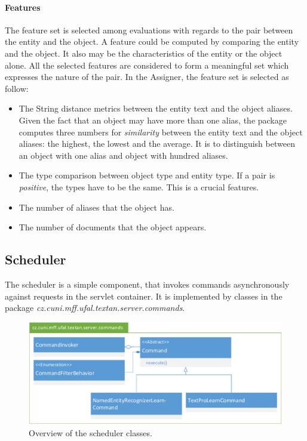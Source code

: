 
\paragraph{Features}

The feature set is selected among evaluations with regards to the pair between
the entity and the object. A feature could be computed by comparing the entity 
and the object. It also may be the characteristics of the entity or the object 
alone. All the selected features are considered to form a meaningful set which
expresses the nature of the pair. In the Assigner, the feature set is selected 
as follow:

\begin{itemize}
\item The String distance metrics between the entity text and the object aliases. Given 
the fact that an object may have more than one alias, the package computes three numbers for 
\textit{similarity} between the entity text and the object aliases: the highest, the lowest and
the average. It is to distinguish between an object with one alias and object with hundred aliases.
\item The type comparison between object type and entity type. If a pair is \textit{positive},
the types have to be the same. This is a crucial features. 
\item The number of aliases that the object has.
\item The number of documents that the object appears.  
\end{itemize}


\subsection{Scheduler}
The scheduler is a simple component, that invokes commands asynchronously against
requests in the servlet container. It is implemented by classes in the package
\emph{cz.\-cuni.\-mff.\-ufal.\-textan.\-server.\-commands}.

\begin{figure}[!htb]
        \centering
        \includegraphics[width=\textwidth]{Images/Commands}
        \caption{Overview of the scheduler classes.}
        \label{fig:CommandsOverview}
\end{figure}

